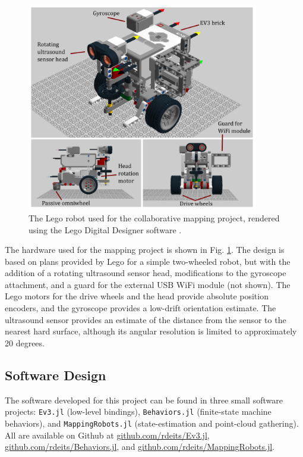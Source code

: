 \documentclass[]{article}
\begin{document}
\begin{figure}[htbp!]
    \centering
    \includegraphics[width=0.9\textwidth]{fig/combined_views.pdf}
    \caption{The Lego robot used for the collaborative mapping project, rendered using the Lego Digital Designer software \cite{the_lego_group_lego_2015}.}
    \label{fig:hardware_cad}
\end{figure}

The hardware used for the mapping project is shown in Fig. \ref{fig:hardware_cad}. The design is based on plans provided by Lego for a simple two-wheeled robot, but with the addition of a rotating ultrasound sensor head, modifications to the gyroscope attachment, and a guard for the external USB WiFi module (not shown). The Lego motors for the drive wheels and the head provide absolute position encoders, and the gyroscope provides a low-drift orientation estimate. The ultrasound sensor provides an estimate of the distance from the sensor to the nearest hard surface, although its angular resolution is limited to approximately 20 degrees. 

\subsection{Software Design}

The software developed for this project can be found in three small software projects: \texttt{Ev3.jl} (low-level bindings), \texttt{Behaviors.jl} (finite-state machine behaviors), and \texttt{MappingRobots.jl} (state-estimation and point-cloud gathering). All are available on Github at \href{https://github.com/rdeits/Ev3.jl}{github.com/rdeits/Ev3.jl}, 
\href{https://github.com/rdeits/Behaviors.jl}{github.com/rdeits/Behaviors.jl}, and \href{https://github.com/rdeits/MappingRobots.jl}{github.com/rdeits/MappingRobots.jl}. 
\end{document}
